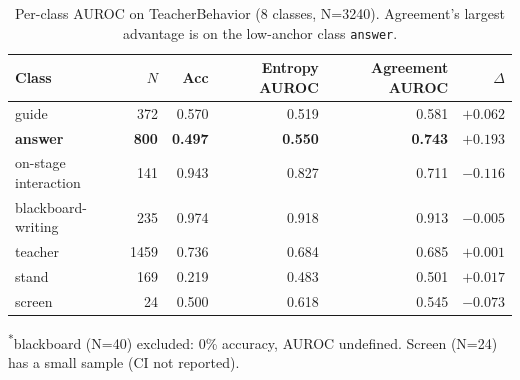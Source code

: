 \documentclass[a4paper,fleqn]{cas-sc}
\begin{document}
\begin{table}[t]
\centering
\caption{Per-class AUROC on TeacherBehavior (8 classes, N=3240). Agreement's largest advantage is on the low-anchor class \texttt{answer}.}
\label{tab:perclass}
\small
\begin{tabular}{lrrrrr}
\toprule
Class & $N$ & Acc & Entropy AUROC & Agreement AUROC & $\Delta$ \\
\midrule
guide & 372 & 0.570 & 0.519 & 0.581 & $+0.062$ \\
\textbf{answer} & \textbf{800} & \textbf{0.497} & \textbf{0.550} & \textbf{0.743} & \textbf{$+0.193$} \\
on-stage interaction & 141 & 0.943 & 0.827 & 0.711 & $-0.116$ \\
blackboard-writing & 235 & 0.974 & 0.918 & 0.913 & $-0.005$ \\
teacher & 1459 & 0.736 & 0.684 & 0.685 & $+0.001$ \\
stand & 169 & 0.219 & 0.483 & 0.501 & $+0.017$ \\
screen & 24 & 0.500 & 0.618 & 0.545 & $-0.073$ \\
\bottomrule
\end{tabular}
\par
\vspace{4pt}
\begin{minipage}{\textwidth}\raggedright\footnotesize\textsuperscript{*}blackboard (N=40) excluded: 0\% accuracy, AUROC undefined. Screen (N=24) has a small sample (CI not reported).\par\end{minipage}
\end{table}
\end{document}
